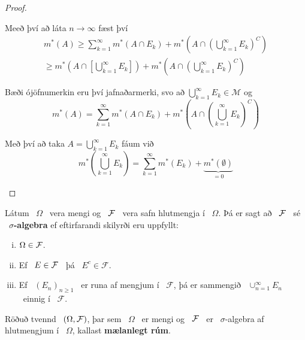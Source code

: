 \documentclass[12pt]{report}
\newcommand{\cM}{\mathcal{M}}
\newcommand{\F}{{\cal F}}
\begin{document}
\begin{proof}
\begin{enumerate}[(i)]
\begin{itemize}
      Meeð því að láta $n \to \infty$ fæst því
      \begin{gather*}
        m^*(A) \geq \sum_{k=1}^{\infty} m^*(A \cap E_k)
        + m^*(A \cap (\bigcup_{k=1}^{\infty} E_k)^C)\\
        \geq m^*(A \cap [\bigcup_{k=1}^{\infty} E_k]) + m^*(A \cap
        (\bigcup_{k=1}^{\infty} E_k)^C)
      \end{gather*}

      Bæði ójöfnumerkin eru því jafnaðarmerki, svo að
      $\bigcup_{k=1}^{\infty} E_k \in \cM$ og
      \[ m^*(A) = \sum_{k=1}^{\infty} m^*(A \cap E_k) + m^*(A \cap
      (\bigcup_{k=1}^{\infty} E_k)^C) \]

      Með því að taka $A = \bigcup_{k=1}^{\infty} E_k$ fáum
      við
      \[m^*(\bigcup_{k=1}^{\infty} E_k) = \sum_{k=1}^{\infty}
      m^*(E_k) + \underbrace{m^*(\emptyset)}_{= 0}\]
    \end{itemize}
  \end{enumerate}
\end{proof}


\begin{skgr*}
Látum \ $\Omega$ \ vera mengi og \ $\F$ \ vera safn hlutmengja í \ $\Omega$. Þá er sagt að \ $\F$ \ sé \ {\bf $\sigma$-algebra} ef eftirfarandi skilyrði eru uppfyllt:
\begin{enumerate}[(i)]
\item
$\Omega\in\F$.
\item
Ef \ $E\in\F$ \ þá \ $E^c\in\mathcal{F}$.
\item
Ef \ $(E_n)_{n\geq 1}$ \ er runa af mengjum í \ $\mathcal{F}$, þá er sammengið \ $\cup_{n=1}^\infty E_n$ \ einnig í \ $\mathcal{F}$. 
\end{enumerate}
\end{skgr*}

Röðuð tvennd \ $(\Omega,\F)$, þar sem  \ $\Omega$ \ er mengi og \ $\F$ \ er \ $\sigma$-algebra af hlutmengjum í \ $\Omega$, kallast {\bf mælanlegt rúm}.
\end{document}
